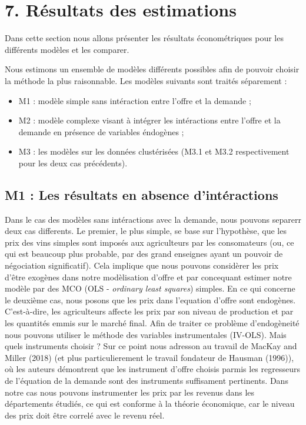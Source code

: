 \documentclass[11pt,]{article}
\providecommand{\tightlist}{%
  \setlength{\itemsep}{0pt}\setlength{\parskip}{0pt}}
\begin{document}
\hypertarget{resultats-des-estimations}{%
\section{7. Résultats des estimations}\label{resultats-des-estimations}}

Dans cette section nous allons présenter les résultats économétriques
pour les différents modèles et les comparer.

Nous estimons un ensemble de modèles différents possibles afin de
pouvoir choisir la méthode la plus raisonnable. Les modèles suivants
sont traités séparement :

\begin{itemize}
\tightlist
\item
  M1 : modèle simple sans intéraction entre l'offre et la demande ;
\item
  M2 : modèle complexe visant à intégrer les intéractions entre l'offre
  et la demande en présence de variables éndogènes ;
\item
  M3 : les modèles sur les données clustérisées (M3.1 et M3.2
  respectivement pour les deux cas précédents).
\end{itemize}

\hypertarget{m1-les-resultats-en-absence-dinteractions}{%
\subsection{M1 : Les résultats en absence
d'intéractions}\label{m1-les-resultats-en-absence-dinteractions}}

Dans le cas des modèles sans intéractions avec la demande, nous pouvons
separerr deux cas differents. Le premier, le plus simple, se base sur
l'hypothèse, que les prix des vins simples sont imposés aux agriculteurs
par les consomateurs (ou, ce qui est beaucoup plus probable, par des
grand enseignes ayant un pouvoir de négociation significatif). Cela
implique que nous pouvons considèrer les prix d'être exogènes dans notre
modèlisation d'offre et par concequant estimer notre modèle par des MCO
(OLS - \emph{ordinary least squares}) simples. En ce qui concerne le
deuxième cas, nous posons que les prix dans l'equation d'offre sont
endogènes. C'est-à-dire, les agriculteurs affecte les prix par son
niveau de production et par les quantités emmis sur le marché final.
Afin de traiter ce problème d'endogèneité nous pouvons utiliser le
méthode des variables instrumentales (IV-OLS). Mais quels instruments
choisir ? Sur ce point nous adresson au travail de MacKay and Miller
(2018) (et plus particulierement le travail fondateur de Hausman
(1996)), où les auteurs démontrent que les instrument d'offre choisis
parmis les regresseurs de l'équation de la demande sont des instruments
suffisament pertinents. Dans notre cas nous pouvons instrumenter les
prix par les revenus dans les départements étudiés, ce qui est conforme
à la théorie économique, car le niveau des prix doit être correlé avec
le revenu réel.
\end{document}
